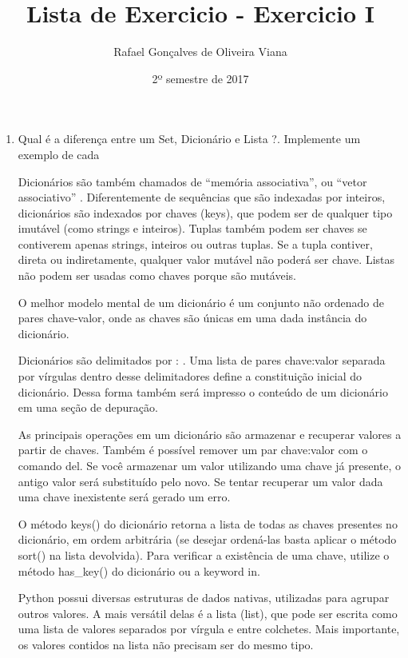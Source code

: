 \documentclass[12pt]{article}
\title{Lista de Exercicio  - Exercicio I }
\author{Rafael Gonçalves de  Oliveira Viana}
\date{2º semestre de 2017}
\begin{document}
\maketitle

\begin{enumerate}
\item Qual é a diferença entre um Set, Dicionário e Lista ?. Implemente um exemplo de cada

Dicionários são também chamados de ``memória associativa'', ou ``vetor associativo'' . Diferentemente de sequências que são indexadas por inteiros, dicionários são indexados por chaves (keys), que podem ser de qualquer tipo imutável (como strings e inteiros). Tuplas também podem ser chaves se contiverem apenas strings, inteiros ou outras tuplas. Se a tupla contiver, direta ou indiretamente, qualquer valor mutável não poderá ser chave. Listas não podem ser usadas como chaves porque são mutáveis.

O melhor modelo mental de um dicionário é um conjunto não ordenado de pares chave-valor, onde as chaves são únicas em uma dada instância do dicionário.

Dicionários são delimitados por : {}. Uma lista de pares chave:valor separada por vírgulas dentro desse delimitadores define a constituição inicial do dicionário. Dessa forma também será impresso o conteúdo de um dicionário em uma seção de depuração.

As principais operações em um dicionário são armazenar e recuperar valores a partir de chaves. Também é possível remover um par chave:valor com o comando del. Se você armazenar um valor utilizando uma chave já presente, o antigo valor será substituído pelo novo. Se tentar recuperar um valor dada uma chave inexistente será gerado um erro.

O método keys() do dicionário retorna a lista de todas as chaves presentes no dicionário, em ordem arbitrária (se desejar ordená-las basta aplicar o método sort() na lista devolvida). Para verificar a existência de uma chave, utilize o método has\_key() do dicionário ou a keyword in.


Python possui diversas estruturas de dados nativas, utilizadas para agrupar outros valores. A mais versátil delas é a lista (list), que pode ser escrita como uma lista de valores separados por vírgula e entre colchetes. Mais importante, os valores contidos na lista não precisam ser do mesmo tipo.

\end{enumerate}
\end{document}
